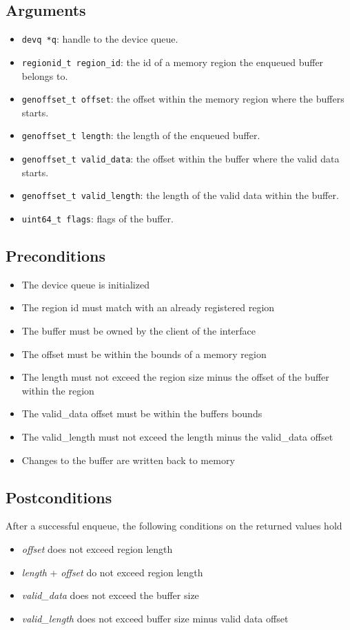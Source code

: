 \documentclass[a4paper,11pt,twoside]{report}
\begin{document}
{{	\subsection*{Arguments}
	\begin{itemize}
		\item \texttt{devq *q}: handle to the device queue.
		\item \texttt{regionid\_t region\_id}: the id of a memory region the enqueued buffer belongs to.
		\item \texttt{genoffset\_t offset}: the offset within the memory region where the buffers starts. 
		\item \texttt{genoffset\_t length}: the length of the enqueued buffer.
		\item \texttt{genoffset\_t valid\_data}: the offset within the buffer where the valid data starts.
		\item \texttt{genoffset\_t valid\_length}: the length of the valid data within the buffer.
		\item \texttt{uint64\_t flags}: flags of the buffer. 
	\end{itemize}
	
	\subsection*{Preconditions}
	\begin{itemize}
		\item The device queue is initialized
		\item The region id must match with an already registered region
		\item The buffer must be owned by the client of the interface 
		\item The offset must be within the bounds of a memory region
		\item The length must not exceed the region size minus the offset of the buffer within the region
		\item The valid\_data offset must be within the buffers bounds
		\item The valid\_length must not exceed the length minus the valid\_data offset
		\item Changes to the buffer are written back to memory
	\end{itemize}
	
	\subsection*{Postconditions}
	After a successful enqueue, the following conditions on the returned values hold
	\begin{itemize}
		\item \textit{offset} does not exceed region length
		\item \textit{length} + \textit{offset} do not exceed region length
		\item \textit{valid\_data} does not exceed the buffer size
		\item \textit{valid\_length} does not exceed buffer size minus valid data offset
	\end{itemize}
	
}}
\end{document}
